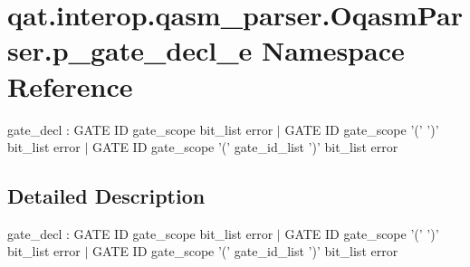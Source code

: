 \hypertarget{namespaceqat_1_1interop_1_1qasm__parser_1_1OqasmParser_1_1p__gate__decl__e}{\section{qat.\-interop.\-qasm\-\_\-parser.\-Oqasm\-Parser.\-p\-\_\-gate\-\_\-decl\-\_\-e Namespace Reference}
\label{namespaceqat_1_1interop_1_1qasm__parser_1_1OqasmParser_1_1p__gate__decl__e}
}


gate\-\_\-decl \-: G\-A\-T\-E I\-D gate\-\_\-scope bit\-\_\-list error $|$ G\-A\-T\-E I\-D gate\-\_\-scope '(' ')' bit\-\_\-list error $|$ G\-A\-T\-E I\-D gate\-\_\-scope '(' gate\-\_\-id\-\_\-list ')' bit\-\_\-list error  




\subsection{Detailed Description}
gate\-\_\-decl \-: G\-A\-T\-E I\-D gate\-\_\-scope bit\-\_\-list error $|$ G\-A\-T\-E I\-D gate\-\_\-scope '(' ')' bit\-\_\-list error $|$ G\-A\-T\-E I\-D gate\-\_\-scope '(' gate\-\_\-id\-\_\-list ')' bit\-\_\-list error 